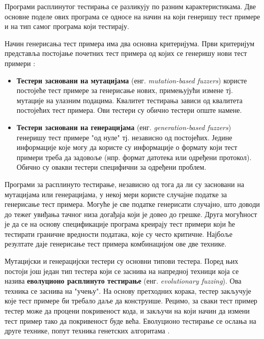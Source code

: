 \documentclass[12pt,oneside]{memoir}
\begin{document}
Програми расплинутог тестирања се разликују по разним карактеристикама. Две основне поделе ових програма се односе на начин на који генеришу тест примере и на тип самог програма који тестирају.

Начин генерисања тест примера има два основна критеријума.
Први критеријум представља постојање почетних тест примера од којих се генеришу нови тест примери \cite{fuzzingBrute, fuzzing}:
\begin{itemize}
\item \textbf{Тестери засновани на мутацијама} (енг. \textit{mutation-based fuzzers}) користе постојеће тест примере за генерисање нових, примењујући измене тј. мутације на улазним подацима. Квалитет тестирања зависи од квалитета постојећих тест примера. Ови тестери су обично тестери опште намене. 
\item \textbf{Тестери засновани на генерацијама} (енг. \textit{generation-based fuzzers}) генеришу тест примере "од нуле" тј. независно од постојећих. Једине информације које могу да користе су информације о формату који тест примери треба да задовоље (нпр. формат датотека или одређени протокол). Обично су овакви тестери специфични за одређени проблем.
\end{itemize}

Програми за расплинуто тестирање, независно од тога да ли су засновани на мутацијама или генерацијама, у некој мери користе случајне податке за генерисање тест примера. Могуће је све податке генерисати случајно, што доводи до тежег увиђања тачног низа догађаја који је довео до грешке. Друга могућност је да се на основу спецификације програма креирају тест примери који ће тестирати граничне вредности података, које су често критичне. Најбоље резултате даје генерисање тест примера комбинацијом ове две технике.

Мутацијски и генерацијски тестери су основни типови тестера. Поред њих постоји још један тип тестера који се заснива на напредној техници која се назива \textbf{еволуционо расплинуто тестирање} (енг. \textit{evolutionary fuzzing}). Ова техника се заснива на "учењу". На основу претходних корака, тестер закључује које тест примере би требало даље да конструише. Рецимо, за сваки тест пример тестер може да процени покривеност кода, и закључи на који начин да измени тест пример тако да покривеност буде већа. Еволуционо тестирање се ослања на друге технике, попут техника генетских алгоритама \cite{fuzzing, 15minuteGuide}.
\end{document}
